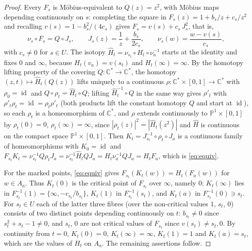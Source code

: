 \documentclass[11pt]{article}
\newcommand{\Pone}{\mathbb P^1}
\newcommand{\C}{\mathbb C}
\newcommand{\id}{\operatorname{id}}
\theoremstyle{remark}
\numberwithin{equation}{section}
\begin{document}
\begin{proof}
Every $F_s$ is M\"obius-equivalent to $Q(z)=z^2$, with M\"obius maps
depending continuously on $s$: completing the square in
$F_s(z)=1+b_s/z+c_s/z^2$ and recalling $v(s)=1-b_s^2/(4c_s)$ gives
$F_s=v(s)+c_s\,J_s^2$, that is,
\[
 \nu_s\circ F_s=Q\circ J_s,\qquad
 J_s(z)=\frac1z+\frac{b_s}{2c_s},\qquad \nu_s(w)=\frac{w-v(s)}{c_s},
\]
with $c_s\ne0$ for $s\in U$. The isotopy
$\widehat H_t=\nu_{s_t}\circ H_t\circ \nu_a^{-1}$ starts at the identity
and fixes $0$ and $\infty$, because $H_t(v_a)=v(s_t)$ and
$H_t(\infty)=\infty$. By the homotopy lifting property of the covering
$Q\colon\C^*\to\C^*$, the homotopy $(z,t)\mapsto\widehat H_t(Q(z))$ lifts
uniquely to a continuous $\rho\colon\C^*\times[0,1]\to\C^*$ with
$\rho_0=\id$ and $Q\circ\rho_t=\widehat H_t\circ Q$; lifting
$\widehat H_t^{-1}\circ Q$ in the same way gives $\rho'_t$ with
$\rho'_t\rho_t=\id=\rho_t\rho'_t$ (both products lift the constant
homotopy $Q$ and start at $\id$), so each $\rho_t$ is a homeomorphism of
$\C^*$, and $\rho$ extends continuously to $\Pone\times[0,1]$ by
$\rho_t(0)=0$, $\rho_t(\infty)=\infty$, since
$|\rho_t(z)|^2=|\widehat H_t(z^2)|$ and $\widehat H$ is continuous on the
compact space $\Pone\times[0,1]$. Then
$K_t=J_{s_t}^{-1}\circ\rho_t\circ J_a$ is a continuous family of
homeomorphisms with $K_0=\id$ and
$F_{s_t}K_t=\nu_{s_t}^{-1}Q\rho_tJ_a=\nu_{s_t}^{-1}\widehat H_tQJ_a
=H_t\nu_a^{-1}QJ_a=H_tF_a$, which is \eqref{eq:equiv}.

For the marked points, \eqref{eq:equiv} gives
$F_{s_t}(K_t(w))=H_t(F_a(w))$ for $w\in A_a$. Thus $K_t(0)$ is the critical
point of $F_{s_t}$ over $\infty$, namely $0$; $K_t(\infty)$ lies in
$F_{s_t}^{-1}(1)=\{\infty,-c_{s_t}/b_{s_t}\}$, $K_t(1)$ in
$F_{s_t}^{-1}(s_t)$, and $K_t(a)$ in $F_{s_t}^{-1}(0)\ni s_t$. For $s_t\in U$ each of the latter three fibres
(over the non-critical values $1$, $s_t$, $0$) consists of
two distinct points depending continuously on $t$: $b_{s_t}\ne0$ since
$s_t^2+s_t-1\ne0$, and $s_t$, $0$ are not critical values of $F_{s_t}$
since $v(s_t)\ne s_t,0$. By continuity from $t=0$,
$K_t(0)=0$, $K_t(\infty)=\infty$, $K_t(1)=1$ and $K_t(a)=s_t$, which are
the values of $H_t$ on $A_a$. The remaining assertions follow.
\end{proof}
\end{document}
